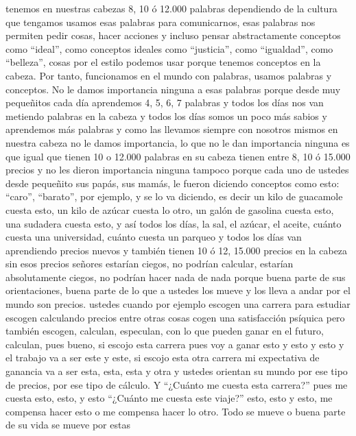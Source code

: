 tenemos en nuestras cabezas 8, 10 ó 12.000 palabras dependiendo de la cultura que tengamos usamos esas palabras para comunicarnos, esas palabras nos permiten pedir cosas, hacer acciones y incluso pensar abstractamente conceptos como \enquote{ideal}, como conceptos ideales como \enquote{justicia}, como \enquote{igualdad}, como \enquote{belleza}, cosas por el estilo podemos usar porque tenemos conceptos en la cabeza. Por tanto, funcionamos en el mundo con palabras, usamos palabras y conceptos. No le damos importancia ninguna a esas palabras porque desde muy pequeñitos cada día aprendemos 4, 5, 6, 7 palabras
y todos los días nos van metiendo palabras en la cabeza y todos los días somos un poco más sabios y aprendemos más palabras y como las llevamos siempre con nosotros mismos en nuestra cabeza no le damos importancia, lo que no le dan importancia ninguna es que igual que tienen 10 o 12.000 palabras en su cabeza tienen entre 8, 10 ó 15.000 precios y no les dieron importancia ninguna tampoco porque cada uno de ustedes desde pequeñito sus papás, sus mamás, le fueron diciendo conceptos como esto: \enquote{caro}, \enquote{barato}, por ejemplo, y se lo va diciendo, es decir un kilo de guacamole cuesta esto, un kilo de azúcar cuesta lo otro, un galón de gasolina cuesta esto, una sudadera cuesta esto, y así todos los días, la sal, el azúcar, el aceite, cuánto cuesta una universidad, cuánto cuesta un parqueo y todos los días van aprendiendo precios nuevos y también tienen 10 ó 12, 15.000 precios en la cabeza sin esos precios señores estarían ciegos, no podrían calcular, estarían absolutamente ciegos, no podrían hacer nada de nada porque buena parte de sus orientaciones, buena parte de lo que a ustedes los mueve y los lleva a andar por el mundo son precios. ustedes cuando por ejemplo escogen una carrera para estudiar escogen calculando precios entre otras cosas cogen una satisfacción psíquica pero también escogen, calculan, especulan, con lo que pueden ganar en el futuro, calculan, pues bueno, si escojo esta carrera pues voy a ganar esto y esto y esto
y el trabajo va a ser este y este, si escojo esta otra carrera mi expectativa de ganancia va a ser esta, esta, esta y otra y ustedes orientan
su mundo por ese tipo de precios, por ese tipo de cálculo. Y \enquote{¿Cuánto me cuesta esta carrera?} pues me cuesta esto, esto, y esto \enquote{¿Cuánto me cuesta este viaje?} esto, esto y esto, me compensa hacer esto o me compensa hacer lo otro. Todo se mueve o buena parte de su vida se mueve por estas
